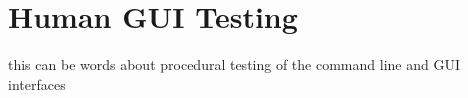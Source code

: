 %
%
\section{Human GUI Testing}
\label{sec:humanity}

this can be words about procedural testing of the command line
and GUI interfaces

%
%
